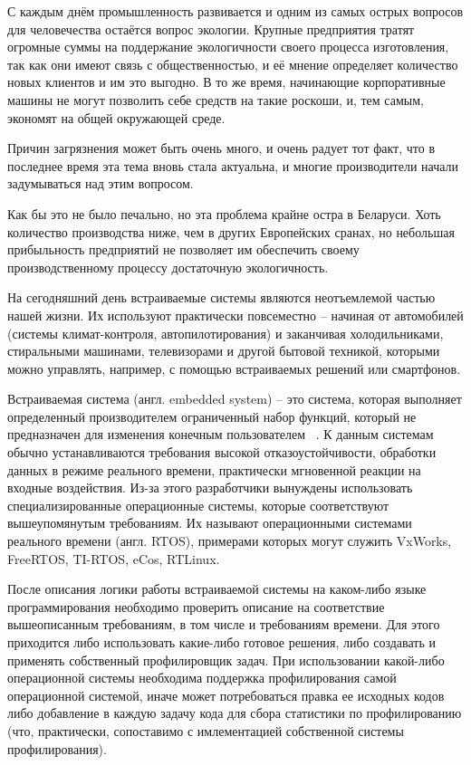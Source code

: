 \label{sec:intro}

С каждым днём промышленность развивается и одним из самых острых вопросов для человечества остаётся вопрос экологии.
Крупные предприятия тратят огромные суммы на поддержание экологичности своего процесса изготовления, 
так как они имеют связь с общественностью, и её мнение определяет количество новых клиентов и им это выгодно.
В то же время, начинающие корпоративные машины не могут позволить себе средств на такие роскоши, 
и, тем самым, экономят на общей окружающей среде.

Причин загрязнения может быть очень много, 
и очень радует тот факт, что в последнее время эта тема вновь стала актуальна, 
и многие производители начали задумываться над этим вопросом.

Как бы это не было печально, но эта проблема крайне остра в Беларуси.
Хоть количество производства ниже, чем в других Европейских сранах, 
но небольшая прибыльность предприятий не позволяет им обеспечить своему производственному процессу достаточную экологичность.



На сегодняшний день встраиваемые системы являются неотъемлемой частью нашей жизни.
Их используют практически повсеместно -- начиная от автомобилей 
(системы климат-контроля, автопилотирования)
и заканчивая холодильниками, стиральными машинами, телевизорами
и другой бытовой техникой, которыми можно управлять, например,
с помощью встраиваемых решений или смартфонов.

Встраиваемая система (англ. embedded system) -- это система, которая выполняет
определенный производителем ограниченный набор функций,
который не предназначен для изменения конечным пользователем ~\cite{esd_book}.
К данным системам обычно устанавливаются требования высокой отказоустойчивости,
обработки данных в режиме реального времени, практически мгновенной реакции
на входные воздействия. Из-за этого разработчики
вынуждены использовать специализированные операционные системы,
которые соответствуют вышеупомянутым требованиям. Их
называют операционными системами реального времени
(англ. RTOS), примерами которых могут служить
VxWorks, FreeRTOS, TI-RTOS, eCos, RTLinux.


После описания логики работы встраиваемой системы на каком-либо
языке программирования необходимо проверить описание на соответствие
вышеописанным требованиям, в том числе и требованиям времени.
Для этого приходится либо использовать какие-либо готовое решения,
либо создавать и применять собственный профилировщик задач.
При использовании какой-либо операционной
системы необходима поддержка профилирования самой операционной системой,
иначе может потребоваться правка ее исходных кодов либо добавление
в каждую задачу кода для сбора статистики по профилированию (что, практически, сопоставимо с
имлементацией собственной системы профилирования).

